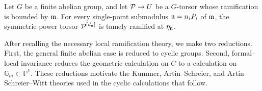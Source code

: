 \begin{theorem}\label{theorem:torsors_after_blowup_is_tame}
Let $G$ be a finite abelian group, and let $\mathcal{P} \to U$ be a $G$-torsor whose
ramification is bounded by $\mathfrak{m}$. For every single-point submodulus
$\mathfrak{n} = n_iP_i$ of $\mathfrak{m}$, the symmetric-power torsor
$\mathcal{P}^{[d_{\mathfrak{n}}]}$ is tamely ramified at $\eta_{\mathfrak{n}}$.
\end{theorem}

After recalling the necessary local ramification theory, we make two
reductions. First, the general finite abelian case is reduced to cyclic groups.
Second, formal--local invariance reduces the geometric calculation on $C$ to a
calculation on $\mathbb{G}_m \subset \mathbb{P}^1$. These reductions motivate the
Kummer, Artin--Schreier, and Artin--Schreier--Witt theories used in the cyclic
calculations that follow.
